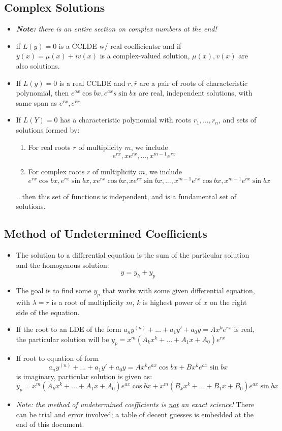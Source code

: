 \documentclass[10pt,letterpaper]{article}
\begin{document}
\subsection*{Complex Solutions}
\begin{itemize}

\item \textit{\textbf{Note: }there is an entire section on complex numbers at the end!}

\item if $L(y)=0$ is a CCLDE w/ real coefficientsr and if $y(x) = \mu(x) + iv(x)$ is a complex-valued solution, $\mu(x), v(x)$ are also solutions. 

\item If $L(y)=0$ is a real CCLDE and $r, \bar{r}$ are a pair of roots of characteristic polynomial, then 
$e^{ax}\cos bx, e^{ax}s\sin bx$ are real, independent solutions, with same span as $e^{rx}, e^{\bar{r}x}$

\item If $L(Y)=0$ has a characteristic polynomial with roots $r_1, ...,r_n$, and sets of solutions formed by: 
\begin{enumerate}
\item For real roots $r$ of multiplicity $m$, we include 
$$e^{rx}, xe^{rx}, ..., x^{m-1}e^{rx}$$
\item For complex roots $r$ of multiplicity $m$, we include
 $$e^{rx}\cos bx, e^{rx}\sin bx, xe^{rx}\cos bx, xe^{rx}\sin bx , ..., x^{m-1}e^{rx}\cos bx, x^{m-1}e^{rx}\sin bx$$
\end{enumerate}
...then this set of functions is independent, and is a fundamental set of solutions. 


\end{itemize}



\subsection*{Method of Undetermined Coefficients}
\begin{itemize}
\item The solution to a differential equation is the sum of the particular solution and the homogenous solution: 
$$ y= y_h+y_p$$
\item The goal is to find some $y_p$ that works with some given differential equation, with $\lambda = r$ is a root of multiplicity $m$, $k$ is highest power of $x$ on the right side of the equation. 
\item If the root to an LDE of the form $a_ny^{(n)}+...+a_1y'+a_0y=Ax^ke^{rx}$ is real, the particular solution will be $y_p=x^m(A_kx^k+...+A_1x+A_0)e^{rx}$
\item If root to equation of form 
$$ a_ny^{(n)}+...+a_1y'+a_0y=Ax^ke^{ax}\cos bx+Bx^ke^{ax}\sin bx $$
is imaginary, particular solution is given as: 
$$ y_p = x^m(A_kx^k+...+A_1x+A_0)e^{ax}\cos bx + x^m(B_kx^k+...+B_1x+B_0)e^{ax}\sin bx $$
\item \textit{Note: the method of undetermined coefficients is \underline{not} an exact science!} There can be trial and error involved; a table of decent guesses is embedded at the end of this document. 
\end{itemize}
\end{document}
